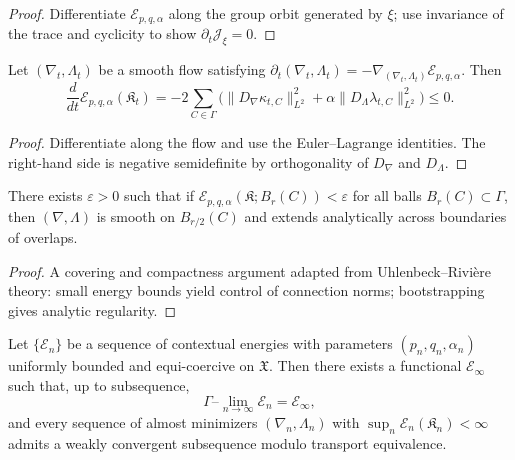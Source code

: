 \begin{proof}
Differentiate $\mathcal E_{p,q,\alpha}$ along the group orbit generated by $\xi$; use invariance of the trace and cyclicity to show $\partial_t\mathcal J_\xi=0$. \relax
\end{proof}


\begin{lemma}\label{lem:energy-monotonicity}
Let $(\nabla_t,\Lambda_t)$ be a smooth flow satisfying $\partial_t(\nabla_t,\Lambda_t)=-\nabla_{\!(\nabla_t,\Lambda_t)}\mathcal E_{p,q,\alpha}$.
Then
\[
\frac{d}{dt}\mathcal E_{p,q,\alpha}(\mathfrak K_t)=-2\!\!\sum_{C\in\Gamma}\!\!\Big(
\|D_\nabla\kappa_{t,C}\|_{L^2}^2+\alpha\|D_\Lambda\lambda_{t,C}\|_{L^2}^2
\Big)\le0.
\]
\end{lemma}

\begin{proof}
Differentiate along the flow and use the Euler–Lagrange identities. The right-hand side is negative semidefinite by orthogonality of $D_\nabla$ and $D_\Lambda$. \relax
\end{proof}

\begin{theorem}[ε–regularity]\label{thm:epsilon-regularity}
There exists $\varepsilon>0$ such that if $\mathcal E_{p,q,\alpha}(\mathfrak K;B_r(C))<\varepsilon$ for all balls $B_r(C)\subset\Gamma$, then $(\nabla,\Lambda)$ is smooth on $B_{r/2}(C)$ and extends analytically across boundaries of overlaps.
\end{theorem}

\begin{proof}
A covering and compactness argument adapted from Uhlenbeck–Rivière theory: small energy bounds yield control of connection norms; bootstrapping gives analytic regularity. \relax
\end{proof}


\begin{theorem}\label{thm:Gamma-compact}
Let $\{\mathcal E_n\}$ be a sequence of contextual energies with parameters $(p_n,q_n,\alpha_n)$ uniformly bounded and equi-coercive on $\mathfrak X$. Then there exists a functional $\mathcal E_\infty$ such that, up to subsequence,
\[
\Gamma\text{–}\lim_{n\to\infty}\mathcal E_n=\mathcal E_\infty,
\]
and every sequence of almost minimizers $(\nabla_n,\Lambda_n)$ with $\sup_n\mathcal E_n(\mathfrak K_n)<\infty$ admits a weakly convergent subsequence modulo transport equivalence.
\end{theorem}

